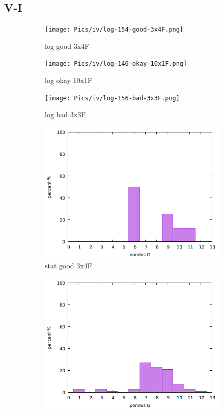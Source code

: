 \subsection{V-I}
\begin{figure}
    \centering
    \begin{subfigure}{.3\textwidth}
        \texttt{[image: Pics/iv/log-154-good-3x4F.png]}
        \caption{log good 3x4F} \label{fig:log2}
    \end{subfigure}
    \begin{subfigure}{.3\textwidth}
        \texttt{[image: Pics/iv/log-146-okay-10x1F.png]}
        \caption{log okay 10x1F} \label{fig:log1}
    \end{subfigure}
    \begin{subfigure}{.3\textwidth}
        \texttt{[image: Pics/iv/log-156-bad-3x3F.png]}
        \caption{log bad 3x3F} \label{fig:log3}
    \end{subfigure}
    \begin{subfigure}{.3\textwidth}
        \includegraphics[width=\textwidth]{Pics/iv/stat-154-okay-3x4F.png}
        \caption{stat good 3x4F} \label{fig:stat2}
    \end{subfigure}
    \begin{subfigure}{.3\textwidth}
        \includegraphics[width=\textwidth]{Pics/iv/stat-146-good-10x1F.png}

\end{subfigure}
\end{figure}
